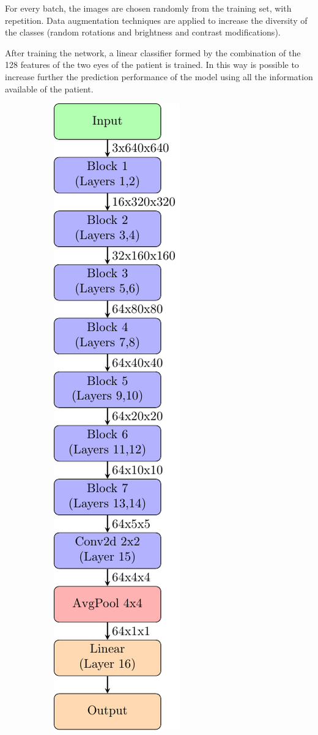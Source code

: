 \documentclass[preprint]{elsarticle}
\theoremstyle{definition} %
\theoremstyle{remark}
\begin{document}
For every batch, the images are chosen randomly from the training set, with repetition. Data augmentation techniques are applied to increase the diversity of the classes (random rotations and brightness and contrast modifications). 

After training the network, a linear classifier formed by the combination of the 128 features of the two eyes of the patient is trained. In this way is possible to increase further the prediction performance of the model using all the information available of the patient.

\begin{figure}[h!]
	\begin{subfigure}[b]{.30\textwidth}
		\centering
		\includegraphics[width=\textwidth]{figures/model640.pdf}

\end{subfigure}
\end{figure}
\end{document}
